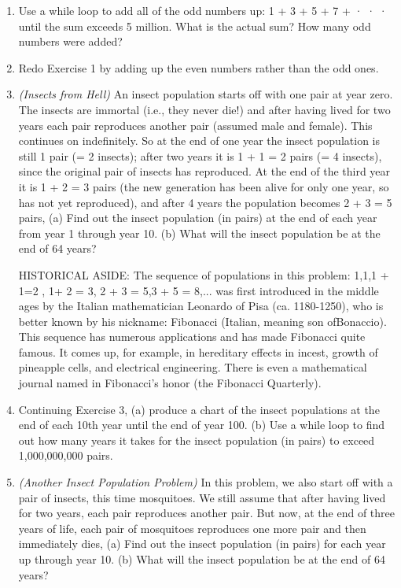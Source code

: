 \documentclass[../main.tex]{subfiles}
\begin{document}
\begin{enumerate}

\item Use a while loop to add all of the odd numbers up: 1 + 3 + 5 + 7 + · · · until the sum exceeds 5 
million. What is the actual sum? How many odd numbers were added?

\item Redo Exercise 1 by adding up the even numbers rather than the odd ones.

\item\emph{(Insects from Hell)} An insect population starts off with one pair at year zero. The insects are 
immortal (i.e., they never die!) and after having lived for two years each pair reproduces another 
pair (assumed male and female). This continues on indefinitely. So at the end of one year the 
insect population is still 1 pair (= 2 insects); after two years it is 1 + 1 = 2 pairs (= 4 insects), 
since the original pair of insects has reproduced. At the end of the third year it is 1 + 2 = 3 
pairs (the new generation has been alive for only one year, so has not yet reproduced), and after 
4 years the population becomes 2 + 3 = 5 pairs, (a) Find out the insect population (in pairs) at 
the end of each year from year 1 through year 10. (b) What will the insect population be at the 
end of 64 years? 

HISTORICAL ASIDE: The sequence of populations in this problem: 1,1,1 + 1=2 , 1+ 2 = 3, 2 + 3 
= 5,3 + 5 = 8,... was first introduced in the middle ages by the Italian mathematician Leonardo of Pisa 
(ca. 1180-1250), who is better known by his nickname: Fibonacci (Italian, meaning son ofBonaccio). 
This sequence has numerous applications and has made Fibonacci quite famous. It comes up, for 
example, in hereditary effects in incest, growth of pineapple cells, and electrical engineering. There is 
even a mathematical journal named in Fibonacci's honor (the Fibonacci Quarterly). 

\item Continuing Exercise 3, (a) produce a chart of the insect populations at the end of each 10th year 
until the end of year 100. (b) Use a while loop to find out how many years it takes for the insect 
population (in pairs) to exceed 1,000,000,000 pairs. 

\item \emph{(Another Insect Population Problem)} In this problem, we also start off with a pair of insects, 
this time mosquitoes. We still assume that after having lived for two years, each pair reproduces 
another pair. But now, at the end of three years of life, each pair of mosquitoes reproduces one 
more pair and then immediately dies, (a) Find out the insect population (in pairs) for each year 
up through year 10. (b) What will the insect population be at the end of 64 years?


\end{enumerate}
\end{document}
